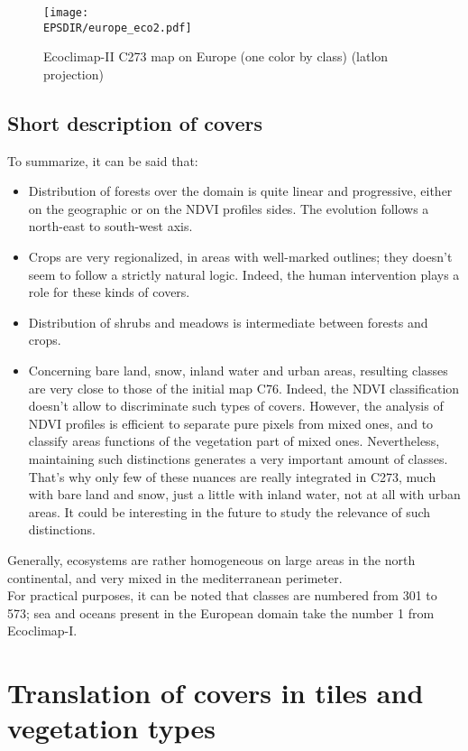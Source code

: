 \begin{figure}
\begin{center}
\texttt{[image: \\EPSDIR/europe\_eco2.pdf]}
\caption{\label{figure2} Ecoclimap-II C273 map on Europe (one color by class) (latlon projection)} 
\end{center}
\end{figure}

\subsection{Short description of covers}

To summarize, it can be said that:
\begin{itemize}
\item{Distribution of forests over the domain is quite linear and progressive, either on the geographic or on the NDVI profiles sides. The evolution 
follows a north-east to south-west axis.}
\item{Crops are very regionalized, in areas with well-marked outlines; they doesn't seem to follow a strictly natural logic. Indeed, 
the human intervention plays a role for these kinds of covers.}
\item{Distribution of shrubs and meadows is intermediate between forests and crops.}
\item{Concerning bare land, snow, inland water and urban areas, resulting classes are very close to those of the initial map C76. Indeed, the NDVI 
classification doesn't allow to discriminate such types of covers. However, the analysis of NDVI profiles is efficient to separate pure 
pixels from mixed ones, and to classify areas functions of the vegetation part of mixed ones. Nevertheless, maintaining such distinctions 
generates a very important amount of classes. That's why only few of these nuances are really integrated in C273, much with bare land and 
snow, just a little with inland water, not at all with urban areas. It could be interesting in the future to study the relevance of such 
distinctions.}
\end{itemize}
Generally, ecosystems are rather homogeneous on large areas in the north continental, and very mixed in the mediterranean perimeter. \\

For practical purposes, it can be noted that classes are numbered from 301 to 573; sea and oceans present in the European domain 
take the number 1 from Ecoclimap-I. 

\section{Translation of covers in tiles and vegetation types}

